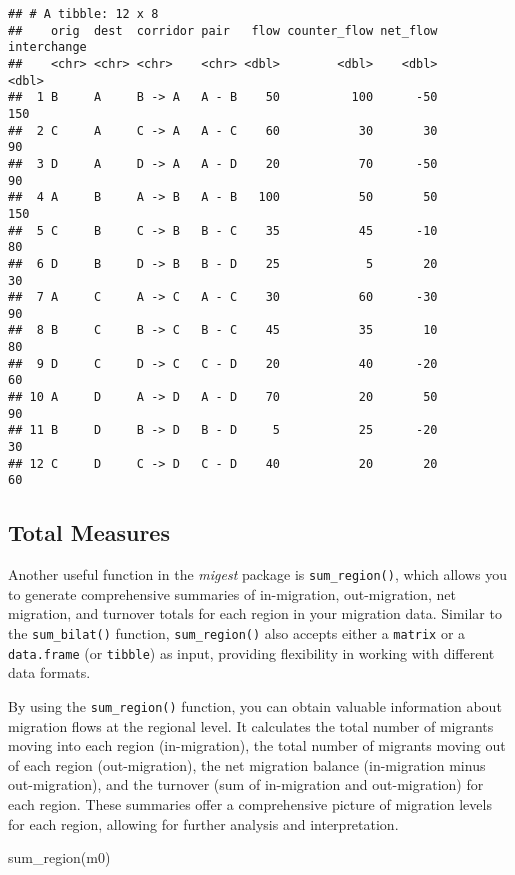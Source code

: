 \documentclass[
]{book}
\newenvironment{Shaded}{\begin{snugshade}}{\end{snugshade}}
\newcommand{\FunctionTok}[1]{\textcolor[rgb]{0.00,0.00,0.00}{#1}}
\newcommand{\NormalTok}[1]{#1}
\begin{document}
\begin{verbatim}
## # A tibble: 12 x 8
##    orig  dest  corridor pair   flow counter_flow net_flow interchange
##    <chr> <chr> <chr>    <chr> <dbl>        <dbl>    <dbl>       <dbl>
##  1 B     A     B -> A   A - B    50          100      -50         150
##  2 C     A     C -> A   A - C    60           30       30          90
##  3 D     A     D -> A   A - D    20           70      -50          90
##  4 A     B     A -> B   A - B   100           50       50         150
##  5 C     B     C -> B   B - C    35           45      -10          80
##  6 D     B     D -> B   B - D    25            5       20          30
##  7 A     C     A -> C   A - C    30           60      -30          90
##  8 B     C     B -> C   B - C    45           35       10          80
##  9 D     C     D -> C   C - D    20           40      -20          60
## 10 A     D     A -> D   A - D    70           20       50          90
## 11 B     D     B -> D   B - D     5           25      -20          30
## 12 C     D     C -> D   C - D    40           20       20          60
\end{verbatim}

\hypertarget{total-measures}{%
\subsection{Total Measures}\label{total-measures}}

Another useful function in the \emph{migest} package is \texttt{sum\_region()}, which allows you to generate comprehensive summaries of in-migration, out-migration, net migration, and turnover totals for each region in your migration data. Similar to the \texttt{sum\_bilat()} function, \texttt{sum\_region()} also accepts either a \texttt{matrix} or a \texttt{data.frame} (or \texttt{tibble}) as input, providing flexibility in working with different data formats.

By using the \texttt{sum\_region()} function, you can obtain valuable information about migration flows at the regional level. It calculates the total number of migrants moving into each region (in-migration), the total number of migrants moving out of each region (out-migration), the net migration balance (in-migration minus out-migration), and the turnover (sum of in-migration and out-migration) for each region. These summaries offer a comprehensive picture of migration levels for each region, allowing for further analysis and interpretation.

\begin{Shaded}
\begin{Highlighting}[]
\FunctionTok{sum\_region}\NormalTok{(m0)}
\end{Highlighting}
\end{Shaded}
\end{document}
